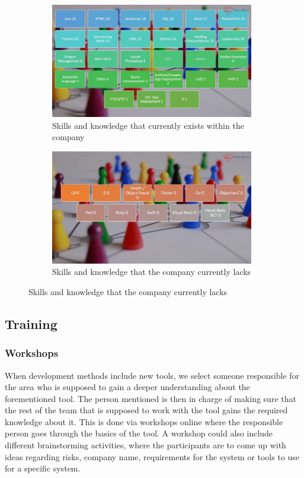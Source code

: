 \begin{figure}[h]
\begin{subfigure}{0.5\textwidth}
\includegraphics[width=0.9\linewidth, height=5cm]{Pictures/Skills.jpeg} 
\caption{Skills and knowledge that currently exists within the company}
\label{fig:skills}
\end{subfigure}
\begin{subfigure}{0.5\textwidth}
\includegraphics[width=0.9\linewidth, height=5cm]{Pictures/Unskills.jpeg}
\caption{Skills and knowledge that the company currently lacks}
\label{fig:unskills}
\end{subfigure}
\end{figure}


\subsection{Training}
\subsubsection{Workshops}
When development methods include new tools, we select someone responsible for the area who is supposed to gain a deeper understanding about the forementioned tool. The person mentioned is then in charge of making sure that the rest of the team that is supposed to work with the tool gains the required knowledge about it. This is done via workshops online where the responsible person goes through the basics of the tool.  A workshop could also include different brainstorming activities, where the participants are to come up with ideas regarding risks, company name, requirements for the system or tools to use for a specific system. 

